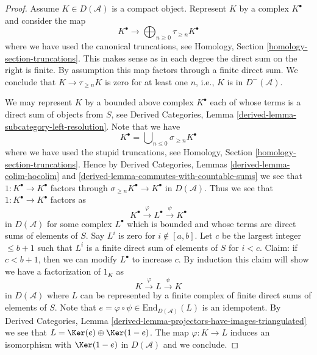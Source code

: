 \begin{proof}
Assume $K \in D(\mathcal{A})$ is a compact object. Represent $K$ by a complex
$K^\bullet$ and consider the map
$$
K^\bullet
\longrightarrow
\bigoplus\nolimits_{n \geq 0} \tau_{\geq n} K^\bullet
$$
where we have used the canonical truncations, see
Homology, Section \ref{homology-section-truncations}.
This makes sense as in each degree the direct sum on the right is finite.
By assumption this map factors through a finite direct sum.
We conclude that $K \to \tau_{\geq n} K$ is zero for at least one $n$,
i.e., $K$ is in $D^{-}(\mathcal{A})$.

\medskip\noindent
We may represent $K$ by a bounded above complex $K^\bullet$ each of whose
terms is a direct sum of objects from $S$, see
Derived Categories, Lemma \ref{derived-lemma-subcategory-left-resolution}.
Note that we have
$$
K^\bullet = \bigcup\nolimits_{n \leq 0} \sigma_{\geq n}K^\bullet
$$
where we have used the stupid truncations, see
Homology, Section \ref{homology-section-truncations}.
Hence by Derived Categories, Lemmas \ref{derived-lemma-colim-hocolim} and
\ref{derived-lemma-commutes-with-countable-sums}
we see that $1 : K^\bullet \to K^\bullet$ factors through
$\sigma_{\geq n}K^\bullet \to K^\bullet$ in $D(\mathcal{A})$.
Thus we see that $1 : K^\bullet \to K^\bullet$ factors as
$$
K^\bullet \xrightarrow{\varphi} L^\bullet \xrightarrow{\psi} K^\bullet
$$
in $D(\mathcal{A})$ for some complex $L^\bullet$ which is bounded and
whose terms are direct sums of elements of $S$. Say $L^i$ is zero for
$i \not \in [a, b]$. Let $c$ be the largest integer $\leq b + 1$ such
that $L^i$ is a finite direct sum of elements of $S$ for $i < c$.
Claim: if $c < b + 1$, then we can modify $L^\bullet$ to increase $c$.
By induction this claim will show we have a factorization
of $1_K$ as
$$
K \xrightarrow{\varphi} L \xrightarrow{\psi} K
$$
in $D(\mathcal{A})$ where $L$ can be represented by a finite
complex of finite direct sums of elements of $S$. Note that
$e = \varphi \circ \psi \in \text{End}_{D(\mathcal{A})}(L)$
is an idempotent. By Derived Categories,
Lemma \ref{derived-lemma-projectors-have-images-triangulated}
we see that $L = \Ker(e) \oplus \Ker(1 - e)$.
The map $\varphi : K \to L$ induces an isomorphism with
$\Ker(1 - e)$ in $D(\mathcal{A})$ and we conclude.


\end{proof}
